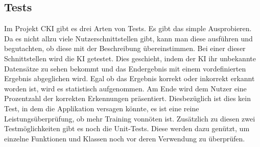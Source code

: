 \subsection{Tests}
\label{sec:DesignTests}
Im Projekt CKI gibt es drei Arten von Tests. Es gibt das simple Ausprobieren. Da es nicht allzu viele Nutzerschnittstellen gibt, kann man diese ausführen und begutachten, ob diese mit der Beschreibung übereinstimmen.
Bei einer dieser Schnittstellen wird die KI getestet. Dies geschieht, indem der KI ihr unbekannte Datensätze zu sehen bekommt und das Endergebnis mit einem vordefinierten Ergebnis abgeglichen wird.
Egal ob das Ergebnis korrekt oder inkorrekt erkannt worden ist, wird es statistisch aufgenommen. Am Ende wird dem Nutzer eine Prozentzahl der korrekten Erkennungen präsentiert. Diesbezüglich ist dies 
kein Test, in dem die Applikation versagen könnte, es ist eine reine Leistungsüberprüfung, ob mehr Training vonnöten ist.
Zusätzlich zu diesen zwei Testmöglichkeiten gibt es noch die Unit-Tests. Diese werden dazu genützt, um einzelne Funktionen und Klassen noch vor deren Verwendung zu überprüfen.




